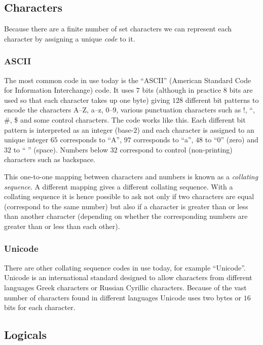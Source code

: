 \subsection{Characters}

Because there are a finite number of set characters we can represent each
character by assigning a unique \emph{code} to it.

\subsubsection{ASCII}

The most common code in use today is the ``ASCII'' (American Standard
Code for Information Interchange) code.  It uses $7$ bits (although in
practice $8$ bits are used so that each character takes up one byte)
giving $128$ different bit patterns to encode the characters A--Z,
a--z, 0--9, various punctuation characters such as !, ``, \#, \$ \etc
and some control characters. The code works like this. Each different
bit pattern is interpreted as an integer (base-$2$) and each character
is assigned to an unique integer \eg $65$ corresponds to ``A'', $97$
corresponds to ``a'', $48$ to ``0'' (zero) and $32$ to ``\,\,''
(space). Numbers below $32$ correspond to control (non-printing)
characters such as backspace.

This one-to-one mapping between characters and numbers is known as a
\emph{collating sequence}. A different mapping gives a different collating
sequence. With a collating sequence it is hence possible to ask not only if
two characters are equal (correspond to the same number) but also if a
character is greater than or less than another character (depending on whether
the corresponding numbers are greater than or less than each other).

\subsubsection{Unicode}

There are other collating sequence codes in use today, for example
``Unicode''. Unicode is an international standard designed to allow
characters from different languages \eg Greek characters or Russian
Cyrillic characters. Because of the vast number of characters found in
different languages Unicode uses two bytes or $16$ bits for each
character.

\subsection{Logicals}

